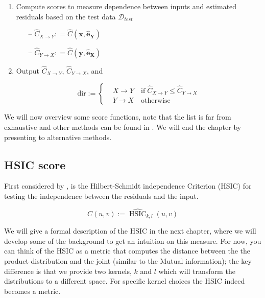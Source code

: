 \begin{algorithm}[H]
\begin{enumerate}
        \item Compute scores to measure dependence between inputs and estimated residuals based on the
        test data $\mathcal{D}_{test}$
        \begin{itemize}
            \item[--] $\hat{C}_{X \rightarrow Y}: = \hat{C}(\mathbf{x}, \mathbf{\hat{e}_Y})$ 
            \item[--] $\hat{C}_{Y \rightarrow X}: = \hat{C}(\mathbf{y}, \mathbf{\hat{e}_X})$
        \end{itemize}        

        \item Output $\hat{C}_{X \rightarrow Y}$, $\hat{C}_{Y \rightarrow X}$, and
        
        \[ 
        \text{dir} :=  
         \begin{cases} 
            & X \rightarrow Y \quad \text{if} \; \hat{C}_{X \rightarrow Y} \leq \hat{C}_{Y \rightarrow X}\\
            & Y \rightarrow X \quad \text{otherwise}
         \end{cases}
        \]
        
    \end{enumerate}

  \label{alg:anm_general}
  \end{algorithm}


  We will now overview some score functions, note that the list is far from exhaustive and other methods can be found 
  in \cite{Mooij2016jmlr}. We will end the chapter by presenting to alternative methods. 

\subsection{HSIC score}

First considered by \cite{hoyer2009nonlinear}, is the Hilbert-Schmidt independence Criterion (HSIC) for
testing the independence between the residuals and the input. 

$$
  \hat{C}(u, v) := \widehat{\operatorname{HSIC}}_{k, l} (u, v)
$$

We will give a formal description of the HSIC in the next chapter, where we will develop some of the background 
to get an intuition on this measure. For now, you can think of the HSIC as a metric that computes the distance 
between the the product distribution and the joint (similar to the Mutual information); the key difference is that 
we provide two kernels, $k$ and $l$ which will transform the distributions to a different space. For specific 
kernel choices the HSIC indeed becomes a metric. 

